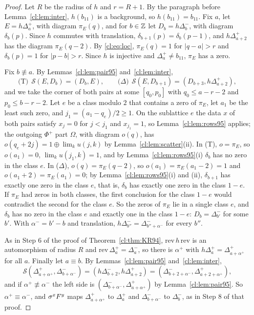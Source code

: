 \begin{proof}
Let $R$ be the radius of $h$ and $r=R+1$. By the paragraph before Lemma~\ref{cl:lem:inter}, $h(b_{11})$ is a background, so $h(b_{11})=b_{11}$. Fix $a$, let $E=h\Delta^+_a$, with diagram $\pi_E(q)$, and for $b\in\mathbb{Z}$ let $D_b=h\Delta^-_b$, with diagram $\delta_b(p)$. Since $h$ commutes with translation, $\delta_{b+1}(p)=\delta_b(p-1)$, and $h\Delta^+_{a+2}$ has the diagram $\pi_E(q-2)$. By \eqref{cl:eq:loc}, $\pi_E(q)=1$ for $|q-a|>r$ and $\delta_b(p)=1$ for $|p-b|>r$. Since $h$ is injective and $\Delta^+_a\ne b_{11}$, $\pi_E$ has a zero.

Fix $b\not\equiv a$. By Lemmas~\ref{cl:lem:pair95} and~\ref{cl:lem:inter},
\[
\text{(T)}\ \ \mathcal S(E,D_b)=(D_b,E),\qquad\text{($\Delta$)}\ \ \mathcal S(E,D_{b+1})=(D_{b+3},h\Delta^+_{a+2}),
\]
and we take the corner of both pairs at some $[q_0,p_0]$ with $q_0\le a-r-2$ and $p_0\le b-r-2$. Let $e$ be a class modulo $2$ that contains a zero of $\pi_E$, let $a_1$ be the least such zero, and $j_1=(a_1-q_e)/2\ge1$. On the sublattice $e$ the data $x$ of both pairs satisfy $x_j=0$ for $j<j_1$ and $x_{j_1}=1$, so Lemma~\ref{cl:lem:rows95} applies; the outgoing $\Phi^+$ part $\Omega$, with diagram $o(q)$, has $o(q_e+2j)=1\oplus\lim_ku(j,k)$ by Lemma~\ref{cl:lem:scatter}(ii). In (T), $o=\pi_E$, so $o(a_1)=0$, $\lim_ku(j_1,k)=1$, and by Lemma~\ref{cl:lem:rows95}(i) $\delta_b$ has no zero in the class $e$. In ($\Delta$), $o(q)=\pi_E(q-2)$, so $o(a_1)=\pi_E(a_1-2)=1$ and $o(a_1+2)=\pi_E(a_1)=0$; by Lemma~\ref{cl:lem:rows95}(i) and (ii), $\delta_{b+1}$ has exactly one zero in the class $e$, that is, $\delta_b$ has exactly one zero in the class $1-e$. If $\pi_E$ had zeros in both classes, the first conclusion for the class $1-e$ would contradict the second for the class $e$. So the zeros of $\pi_E$ lie in a single class $e$, and $\delta_b$ has no zero in the class $e$ and exactly one in the class $1-e$: $D_b=\Delta^-_{b'}$ for some $b'$. With $\alpha^-=b'-b$ and translation, $h\Delta^-_{b''}=\Delta^-_{b''+\alpha^-}$ for every $b''$.

As in Step 6 of the proof of Theorem~\ref{cl:thm:KR94}, $\mathrm{rev}\,h\,\mathrm{rev}$ is an automorphism of radius $R$ and $\mathrm{rev}\,\Delta^+_a=\Delta^-_a$, so there is $\alpha^+$ with $h\Delta^+_a=\Delta^+_{a+\alpha^+}$ for all $a$. Finally let $a\equiv b$. By Lemmas~\ref{cl:lem:pair95} and~\ref{cl:lem:inter},
\[
\mathcal S(\Delta^+_{a+\alpha^+},\Delta^-_{b+\alpha^-})=(h\Delta^-_{b+2},h\Delta^+_{a+2})=(\Delta^-_{b+2+\alpha^-},\Delta^+_{a+2+\alpha^+}),
\]
and if $\alpha^+\not\equiv\alpha^-$ the left side is $(\Delta^-_{b+\alpha^-},\Delta^+_{a+\alpha^+})$ by Lemma~\ref{cl:lem:pair95}. So $\alpha^+\equiv\alpha^-$, and $\sigma^xF^y$ maps $\Delta^+_{a+\alpha^+}$ to $\Delta^+_a$ and $\Delta^-_{b+\alpha^-}$ to $\Delta^-_b$, as in Step 8 of that proof.
\end{proof}

